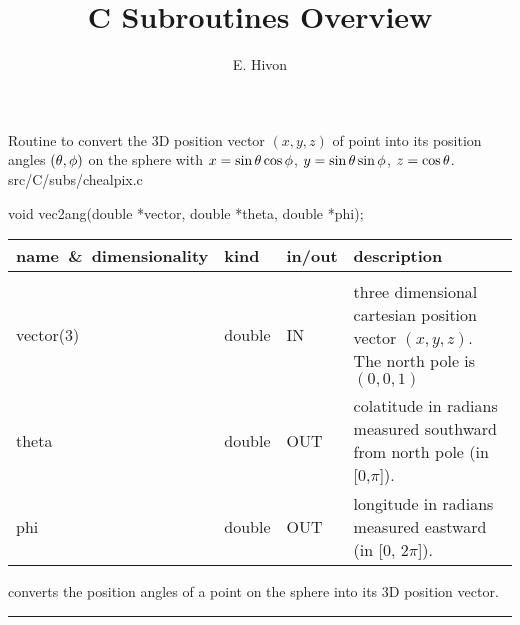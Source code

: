 

\sloppy


\title{\healpix C Subroutines Overview}
 \section[vec2ang]{ }
\label{csub:vec2ang}
\author{E. Hivon}

\begin{facility}
{Routine to convert the 3D position vector $(x,y,z)$ of point into its position
  angles  $(\theta,\phi)$ on the sphere with
$x = \sin\theta\cos\phi$, $y=\sin\theta\sin\phi$, $z=\cos\theta$.
}
{src/C/subs/chealpix.c}
\end{facility}

\begin{Cfunction}
{void vec2ang(double *vector, double *theta, double *phi);}
\end{Cfunction}

\begin{arguments}
{
\begin{tabular}{p{0.3\hsize} p{0.10\hsize} p{0.05\hsize} p{0.45\hsize}} \hline  
\textbf{name~\&~dimensionality} & \textbf{kind} & \textbf{in/out} & \textbf{description} \\ \hline
                   &   &   &                           \\ %
vector(3) & double & IN & three dimensional cartesian position vector
                   $(x,y,z)$. The north pole is $(0,0,1)$\\
theta & double & OUT & colatitude in radians measured southward from north pole (in
    [0,$\pi$]). \\
phi   & double & OUT & longitude in radians measured eastward (in [0, $2\pi$]).\\
\end{tabular}
}
\end{arguments}

\begin{related}
  \begin{sulist}{} %
  \item[\htmlref{ang2vec}{csub:ang2vec}] converts the position angles of a point on the sphere 
into its 3D position vector.
  \end{sulist}
\end{related}

\rule{\hsize}{2mm}

